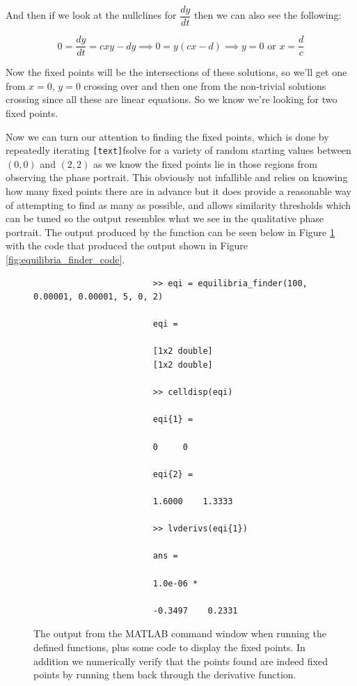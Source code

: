 \documentclass[11pt]{report}
\begin{document}
\begin{enumerate}[label=\alph*)]
\begin{enumerate} [label=\roman*)]
				And then if we look at the nullclines for $\dfrac{dy}{dt}$ then we can also see the following:
				
				$$
				0 = \dfrac{dy}{dt} = cxy - dy \implies 0 = y(cx - d) \implies y = 0 \text{ or } x = \dfrac{d}{c}
				$$
				
				Now the fixed points will be the intersections of these solutions, so we'll get one from $x=0 $, $y=0$ crossing over and then one from the non-trivial solutions crossing since all these are linear equations. So we know we're looking for two fixed points.
				
				Now we can turn our attention to finding the fixed points, which is done by repeatedly iterating \texttt{[text]}fsolve for a variety of random starting values between $(0,0)$ and $(2,2)$ as we know the fixed points lie in those regions from observing the phase portrait. This obviously not infallible and relies on knowing how many fixed points there are in advance but it does provide a reasonable way of attempting to find as many as possible, and allows similarity thresholds which can be tuned so the output resembles what we see in the qualitative phase portrait. The output produced by the function can be seen below in Figure \ref{fig:equilibria_finder_output} with the code that produced the output shown in Figure \ref{fig:equilibria_finder_code}.
				
				\begin{figure}[h]
					\begin{framed}
						\begin{verbatim}
						>> eqi = equilibria_finder(100, 0.00001, 0.00001, 5, 0, 2)
						
						eqi = 
						
						[1x2 double]
						[1x2 double]
						
						>> celldisp(eqi)
						
						eqi{1} =
						
						0     0
						
						eqi{2} =
						
						1.6000    1.3333
						
						>> lvderivs(eqi{1})
						
						ans =
						
						1.0e-06 *
						
						-0.3497    0.2331
						\end{verbatim}
					\end{framed}
					\caption{The output from the MATLAB command window when running the defined functions, plus some code to display the fixed points. In addition we numerically verify that the points found are indeed fixed points by running them back through the derivative function.}
					\label{fig:equilibria_finder_output}
				\end{figure}
				

\end{enumerate}
\end{enumerate}
\end{document}
